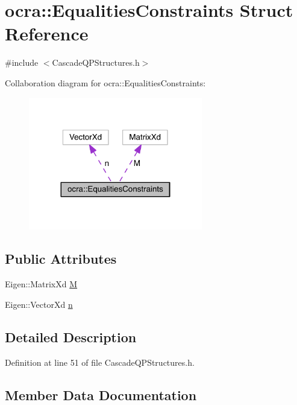 \hypertarget{structocra_1_1EqualitiesConstraints}{}\section{ocra\+:\+:Equalities\+Constraints Struct Reference}
\label{structocra_1_1EqualitiesConstraints}


{\ttfamily \#include $<$Cascade\+Q\+P\+Structures.\+h$>$}



Collaboration diagram for ocra\+:\+:Equalities\+Constraints\+:\nopagebreak
\begin{figure}[H]
\begin{center}
\leavevmode
\includegraphics[width=215pt]{d3/d06/structocra_1_1EqualitiesConstraints__coll__graph}
\end{center}
\end{figure}
\subsection*{Public Attributes}
\begin{DoxyCompactItemize}
\item 
Eigen\+::\+Matrix\+Xd \hyperlink{structocra_1_1EqualitiesConstraints_a948420ad39defa889f402d30041a3521}{M}
\item 
Eigen\+::\+Vector\+Xd \hyperlink{structocra_1_1EqualitiesConstraints_a03425f2d5d16dbb6a0c7da036a2fee77}{n}
\end{DoxyCompactItemize}


\subsection{Detailed Description}


Definition at line 51 of file Cascade\+Q\+P\+Structures.\+h.



\subsection{Member Data Documentation}
\hypertarget{structocra_1_1EqualitiesConstraints_a948420ad39defa889f402d30041a3521}{}\label{structocra_1_1EqualitiesConstraints_a948420ad39defa889f402d30041a3521} 
